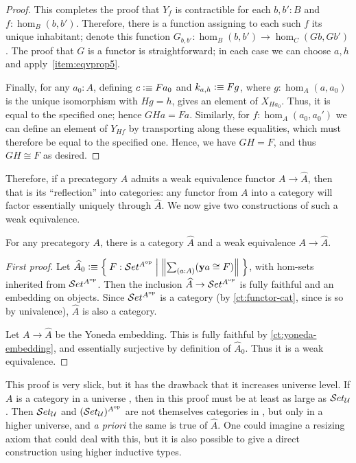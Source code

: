 \begin{proof}
  This completes the proof that $Y_f$ is contractible for each $b,b':B$ and $f:\hom_B(b,b')$.
  Therefore, there is a function assigning to each such $f$ its unique inhabitant; denote this function $G_{b,b'}:\hom_B(b,b') \to \hom_C(Gb,Gb')$.
  The proof that $G$ is a functor is straightforward; in each case we can choose $a,h$ and apply~\ref{item:eqvprop5}.

  Finally, for any $a_0:A$, defining $c\vcentcolon\equiv Fa_0$ and $k_{a,h}\vcentcolon\equiv F g$, where $g:\hom_A(a,a_0)$ is the unique isomorphism with $Hg = h$, gives an element of $X_{Ha_0}$.
  Thus, it is equal to the specified one; hence $GHa=Fa$.
  Similarly, for $f:\hom_A(a_0,a_0')$ we can define an element of $Y_{Hf}$ by transporting along these equalities, which must therefore be equal to the specified one.
  Hence, we have $GH=F$, and thus $GH\cong F$ as desired.
\end{proof}

Therefore, if a precategory $A$ admits a weak equivalence functor $A\to \hat{A}$, then that is its ``reflection'' into categories: any functor from $A$ into a category will factor essentially uniquely through $\widehat{A}$.
We now give two constructions of such a weak equivalence.

\begin{thm}
  For any precategory $A$, there is a category $\widehat A$ and a weak equivalence $A\to\widehat{A}$.
\end{thm}

\begin{proof}[First proof]
  Let $\widehat{A}_0 \defeq \setof{ F:\uset^{A\op} | \brck{\sm{a:A} (\y a \cong F)}}$, with hom-sets inherited from $\mathcal{S}et^{A^{\textrm{op}}}$.
  Then the inclusion $\widehat{A} \to \mathcal{S}et^{A^{\textrm{op}}}$ is fully faithful and an embedding on objects.
  Since $\mathcal{S}et^{A^{\textrm{op}}}$ is a category (by \autoref{ct:functor-cat}, since \uset is so by univalence), $\widehat A$ is also a category.

  Let $A\to\widehat A$ be the Yoneda embedding.
  This is fully faithful by \autoref{ct:yoneda-embedding}, and essentially surjective by definition of $\widehat{A}_0$.
  Thus it is a weak equivalence.
\end{proof}

This proof is very slick, but it has the drawback that it increases universe level.
If $A$ is a category in a universe \bbU, then in this proof \uset must be at least as large as $\mathcal{S}et_\mathcal{U}$.
Then $\mathcal{S}et_\mathcal{U}$ and $(\mathcal{S}et_\mathcal{U})^{A^{\textrm{op}}}$ are not themselves categories in \bbU, but only in a higher universe, and \emph{a priori} the same is true of $\widehat A$.
One could imagine a resizing axiom that could deal with this, but it is also possible to give a direct construction using higher inductive types.

